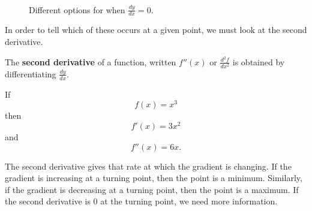 \begin{figure}[H]
     \\
    \centering
  \caption{Different options for when $\frac{dy}{dx}=0$.}
  \label{fig:exponent-graphs}
\end{figure}

In order to tell which of these occurs at a given point, we must look at the second derivative.

\begin{definition}
The \textbf{second derivative} of a function, written $f''(x)$ or $\frac{d^2f}{dx^2}$ is obtained by differentiating $\frac{dy}{dx}$.
\end{definition}

\begin{example}
If $$f(x)=x^3$$ then $$f'(x)=3x^2$$ and $$f''(x)=6x.$$
\end{example}

The second derivative gives that rate at which the gradient is changing.
If the gradient is increasing at a turning point, then the point is a minimum.
Similarly, if the gradient is decreasing at a turning point, then the point is a maximum.
If the second derivative is 0 at the turning point, we need more information.

